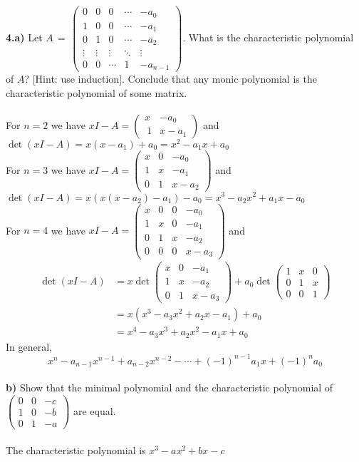 \documentclass[11pt]{amsart}
\theoremstyle{definition}  %
\begin{document}
\newpage
\vskip 0.1cm
\noindent
{\bf 4.a)} Let $A \, = \, \left( \begin{array}{ccccr} 0 & 0 & 0 & \cdots & -a_0 \\ 1 & 0 & 0 & \cdots & -a_1 \\ 0 & 1 & 0 & \cdots & -a_2 \\ 
\vdots & \vdots & \vdots & \ddots & \vdots \\ 0 & 0 & \cdots & 1 & -a_{n-1} \end{array} \right)$. What is the characteristic polynomial of $A$? [Hint: use induction].
Conclude that any monic polynomial is the characteristic polynomial of some matrix. \\
\\
For $n=2$ we have $xI-A=\left(\begin{array}{cc}
x&-a_0 \\\
1&x-a_1
\end{array} \right)$ and $\det(xI-A) = x(x-a_1)+a_0=x^2-a_1x+a_0$\\
For $n=3$ we have $xI-A=\left(\begin{array}{ccc}
x& 0&-a_0 \\
1& x&-a_1 \\
0&1 &x-a_2
\end{array} \right)$ and $\det(xI-A) = x(x(x-a_2)-a_1)-a_0=x^3-a_2x^2+a_1x-a_0$\\
For $n=4$ we have $xI-A=\left(\begin{array}{cccc}
x&0& 0&-a_0 \\
1&x& 0&-a_1 \\
0&1&x &-a_2 \\
0&0&0&x-a_3
\end{array} \right)$ and 
\begin{align*}
	\det(xI-A) &= x\det\left(\begin{array}{ccc}
		x&0&-a_1\\
		1&x&-a_2\\
		0&1&x-a_3
\end{array}	 \right)+a_0\det\left( \begin{array}{ccc}
	1 & x & 0\\
	0 & 1 & x\\
	0 & 0 & 1
\end{array} \right) \\
	&= x(x^3-a_3x^2+a_2x-a_1)+a_0 \\
	&= x^4-a_3x^3+a_2x^2-a_1x+a_0
\end{align*}In general, $$x^n-a_{n-1}x^{n-1}+a_{n-2}x^{n-2}-\cdots+(-1)^{n-1}a_1x+(-1)^na_0$$
\\
{\bf b)} Show that the minimal polynomial and the characteristic polynomial of $\left( \begin{array}{ccr} 0 & 0 & -c \\ 1 & 0 & -b \\ 0 & 1 & -a \end{array} \right)$ are equal.\\
\\
The characteristic polynomial is $x^3-ax^2+bx-c$
\end{document}

